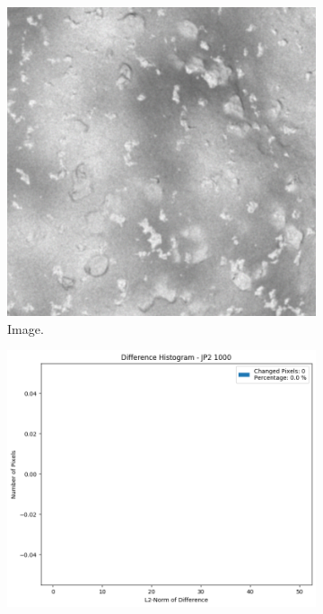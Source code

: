 \begin{figure}[htb]
    \centering
    \begin{subfigure}[b]{0.48\textwidth}
        \centering
        \includegraphics[width=\textwidth]{doc/thesis/0_figures/compare_quality/set1/jp2_1000_center.png}
        \caption{Image.}
        \label{fig:img_quality_comp_jp2_1000_center_orig}
    \end{subfigure}
    \begin{subfigure}[b]{0.48\textwidth}
        \centering
        \includegraphics[width=\textwidth]{doc/thesis/0_figures/compare_quality/set1/jp2_1000_center_diff_histogram.png}

\end{subfigure}
\end{figure}
